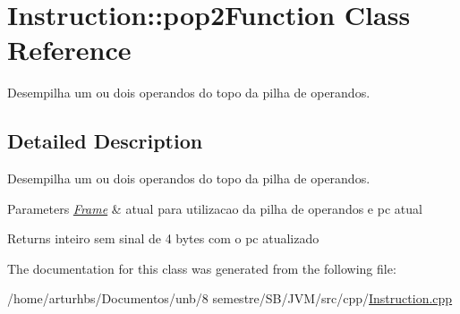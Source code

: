\hypertarget{classInstruction_1_1pop2Function}{}\section{Instruction\+:\+:pop2\+Function Class Reference}
\label{classInstruction_1_1pop2Function}


Desempilha um ou dois operandos do topo da pilha de operandos.  




\subsection{Detailed Description}
Desempilha um ou dois operandos do topo da pilha de operandos. 


\begin{DoxyParams}{Parameters}
{\em \hyperlink{classFrame}{Frame}} & atual para utilizacao da pilha de operandos e pc atual \\
\hline
\end{DoxyParams}
\begin{DoxyReturn}{Returns}
inteiro sem sinal de 4 bytes com o pc atualizado 
\end{DoxyReturn}


The documentation for this class was generated from the following file\+:\begin{DoxyCompactItemize}
\item 
/home/arturhbs/\+Documentos/unb/8 semestre/\+S\+B/\+J\+V\+M/src/cpp/\hyperlink{Instruction_8cpp}{Instruction.\+cpp}\end{DoxyCompactItemize}
